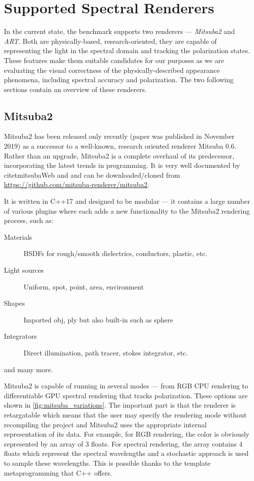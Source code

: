 \section{Supported Spectral Renderers}

In the current state, the benchmark supports two renderers --- \emph{Mitsuba2} and \emph{ART}. Both are physically-based, research-oriented, they are capable of representing the light in the spectral domain and tracking the polarization states. These features make them suitable candidates for our purposes as we are evaluating the visual correctness of the physically-described appearance phenomena, including spectral accuracy and polarization. The two following sections contain an overview of these renderers.

\subsection{Mitsuba2}

Mitsuba2 has been released only recently (paper was published in November 2019) as a successor to a well-known, research oriented renderer Mitsuba 0.6. Rather than an upgrade, Mitsuba2 is a complete overhaul of its predecessor, incorporating the latest trends in programming. It is very well documented by citet{mitsubaWeb} and \citet{nimier2019mitsuba} and can be downloaded/cloned from \url{https://github.com/mitsuba-renderer/mitsuba2}.

It is written in C++17 and designed to be modular --- it contains a large number of various plugins where each adds a new functionality to the Mitsuba2 rendering process, such as:

\begin{description}
	\item[Materials] BSDFs for rough/smooth dielectrics, conductors, plastic, etc.
	\item[Light sources] Uniform, spot, point, area, environment
	\item[Shapes] Imported obj, ply but also built-in such as sphere
	\item[Integrators] Direct illumination, path tracer, stokes integrator, etc.
\end{description}

and many more.

Mitsuba2 is capable of running in several modes --- from RGB CPU rendering to differentiable GPU spectral rendering that tracks polarization. These options are shown in \autoref{fig:mitsuba_variations}. The important part is that the renderer is retargatable which means that the user may specify the rendering mode without recompiling the project and Mitsuba2 uses the appropriate internal representation of its data. For example, for RGB rendering, the color is obviously represented by an array of 3 floats. For spectral rendering, the array contains 4 floats which represent the spectral wavelengths and a stochastic approach is used to sample these wavelengths. This is possible thanks to the template metaprogramming that C++ offers.

